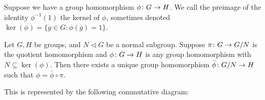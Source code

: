 \begin{definition}
    Suppose we have a group homomorphism \(\phi\colon G\to H\).
    We call the preimage of the identity \(\phi^{-1}(1)\)
    the kernel of \(\phi\),
    sometimes denoted \(\ker(\phi) = \{g \in G : \phi(g) = 1\}\).
\end{definition}

\begin{theorem}\label{thm:univ-prop-quotient-group}
    Let \(G,H\) be groups,
    and \(N \lhd G\) be a normal subgroup.
    Suppose \(\pi\colon G\to G/N\) is the quotient homomorphism
    and \(\phi\colon G\to H\) is any group homomorphism
    with \(N \subseteq \ker(\phi)\).
    Then there exists a unique group homomorphism
    \(\bar{\phi}\colon G/N\to H\) such that \(\phi = \bar{\phi}\circ\pi\).

    This is represented by the following commutative diagram:
    \begin{center}
    \end{center}
\end{theorem}
